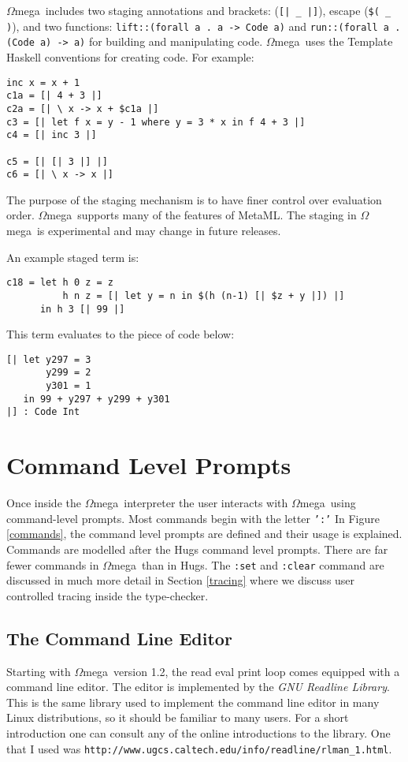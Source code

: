 \documentclass[11pt,twoside]{article}
\newcommand{\om}{$\Omega$mega}
\begin{document}
\om\ includes two staging annotations and brackets: (\verb+[| _ |]+),
escape (\verb+$( _ )+), and two functions: 
{\tt lift::(forall a . a -> Code a)} and {\tt run::(forall a . (Code a) -> a)}
for building and manipulating code. \om\ uses
the Template Haskell\cite{Sheard02} conventions for creating code. For example:
\begin{verbatim}
inc x = x + 1
c1a = [| 4 + 3 |]
c2a = [| \ x -> x + $c1a |]
c3 = [| let f x = y - 1 where y = 3 * x in f 4 + 3 |]
c4 = [| inc 3 |]

c5 = [| [| 3 |] |]
c6 = [| \ x -> x |]
\end{verbatim}

The purpose of the staging mechanism is to have finer control over
evaluation order. \om\ supports many of the features of
MetaML\cite{Sheard:1999:UMS,TS00}. The staging in \om\ is experimental and
may change in future releases.

An example staged term is:
\begin{verbatim}
c18 = let h 0 z = z
          h n z = [| let y = n in $(h (n-1) [| $z + y |]) |]
      in h 3 [| 99 |]
\end{verbatim}
This term evaluates to the piece of code below:
\begin{verbatim}
[| let y297 = 3
       y299 = 2
       y301 = 1
   in 99 + y297 + y299 + y301 
|] : Code Int
\end{verbatim}

\section{Command Level Prompts}  \label{command}



Once inside the \om\ interpreter the user interacts
with \om\ using command-level prompts. Most
commands begin with the letter {\tt ':'}
In Figure \ref{commands}, the command level prompts are defined and their
usage is explained. Commands are modelled after the Hugs command
level prompts. There are far fewer commands in \om\ than in Hugs.
The {\tt :set} and {\tt :clear} command are discussed
in much more detail in Section \ref{tracing} where we discuss 
user controlled tracing inside the type-checker.

\subsection{The Command Line Editor}
Starting with \om\ version 1.2, the read eval print loop comes
equipped with a command line editor. The editor is implemented
by the {\em GNU Readline Library}. This is the same
library used to implement the command line editor
in many Linux distributions, so it should be familiar to
many users. For a short introduction
one can consult any of the online introductions
to the library. One that I used
was \verb+http://www.ugcs.caltech.edu/info/readline/rlman_1.html+.
\end{document}
